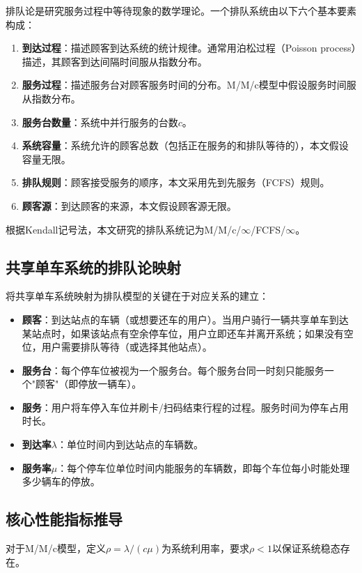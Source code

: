\documentclass[12pt,a4paper]{article}
\begin{document}
排队论是研究服务过程中等待现象的数学理论。一个排队系统由以下六个基本要素构成\cite{gross2008}：
\begin{enumerate}
  \item \textbf{到达过程}：描述顾客到达系统的统计规律。通常用泊松过程（Poisson process）描述，其顾客到达间隔时间服从指数分布。
  \item \textbf{服务过程}：描述服务台对顾客服务时间的分布。M/M/c模型中假设服务时间服从指数分布。
  \item \textbf{服务台数量}：系统中并行服务的台数$c$。
  \item \textbf{系统容量}：系统允许的顾客总数（包括正在服务的和排队等待的），本文假设容量无限。
  \item \textbf{排队规则}：顾客接受服务的顺序，本文采用先到先服务（FCFS）规则。
  \item \textbf{顾客源}：到达顾客的来源，本文假设顾客源无限。
\end{enumerate}

根据Kendall记号法，本文研究的排队系统记为M/M/c/$\infty$/FCFS/$\infty$。

\subsection{共享单车系统的排队论映射}

将共享单车系统映射为排队模型的关键在于对应关系的建立：

\begin{itemize}
  \item \textbf{顾客}：到达站点的车辆（或想要还车的用户）。当用户骑行一辆共享单车到达某站点时，如果该站点有空余停车位，用户立即还车并离开系统；如果没有空位，用户需要排队等待（或选择其他站点）。
  \item \textbf{服务台}：每个停车位被视为一个服务台。每个服务台同一时刻只能服务一个"顾客"（即停放一辆车）。
  \item \textbf{服务}：用户将车停入车位并刷卡/扫码结束行程的过程。服务时间为停车占用时长。
  \item \textbf{到达率$\lambda$}：单位时间内到达站点的车辆数。
  \item \textbf{服务率$\mu$}：每个停车位单位时间内能服务的车辆数，即每个车位每小时能处理多少辆车的停放。
\end{itemize}

\subsection{核心性能指标推导}

对于M/M/c模型，定义$\rho = \lambda/(c\mu)$为系统利用率，要求$\rho < 1$以保证系统稳态存在。
\end{document}

